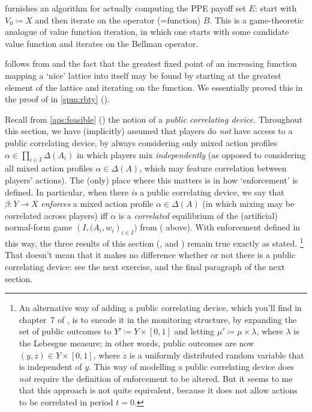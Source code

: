  furnishes an algorithm for actually computing the PPE payoff set $E$: start with $V_0 \coloneqq X$ and then iterate on the operator (=function) $B$. This is a game-theoretic analogue of value function iteration, in which one starts with some candidate value function and iterates on the Bellman operator.

 follows from  and the fact that the greatest fixed point of an increasing function mapping a `nice' lattice into itself may be found by starting at the greatest element of the lattice and iterating on the function. We essentially proved this in the proof of  in \cref{spm:rbty} ().

\begin{remark}
	\label{remark:aps_randomisation}
	Recall from \cref{aps:feasible} () the notion of a \emph{public correlating device.} Throughout this section, we have (implicitly) assumed that players do \emph{not} have access to a public correlating device, by always considering only mixed action profiles $\alpha \in \prod_{i \in I} \Delta(A_i)$ in which players mix \emph{independently} (as opposed to considering all mixed action profiles $\alpha \in \Delta(A)$, which may feature correlation between players' actions). The (only) place where this matters is in how `enforcement' is defined. In particular, when there \emph{is} a public correlating device, we say that $\beta : Y \to X$ \emph{enforces} a mixed action profile $\alpha \in \Delta(A)$ (in which mixing may be correlated across players) iff $\alpha$ is a \emph{correlated} equilibrium of the (artificial) normal-form game $\left(I,(A_i,w_i\right)_{i \in I})$ from  ( above). With enforcement defined in this way, the three results of this section (,  and ) remain true exactly as stated.%
		\footnote{An alternative way of adding a public correlating device, which you'll find in chapter~7 of \textcite{MailathSamuelson2006}, is to encode it in the monitoring structure, by expanding the set of public outcomes to $Y' \coloneqq Y \times [0,1]$ and letting $\mu' \coloneqq \mu \times \lambda$, where $\lambda$ is the Lebesgue measure; in other words, public outcomes are now $(y,z) \in Y \times [0,1]$, where $z$ is a uniformly distributed random variable that is independent of $y$. This way of modelling a public correlating device does \emph{not} require the definition of enforcement to be altered. But it seems to me that this approach is not quite equivalent, because it does not allow actions to be correlated in period $t=0$.}
	That doesn't mean that it makes no difference whether or not there is a public correlating device: see the next exercise, and the final paragraph of the next section.
\end{remark}

